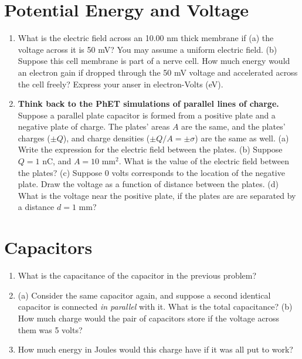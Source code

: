 \documentclass[10pt]{article}
\begin{document}
\section{Potential Energy and Voltage}

\begin{enumerate}
\item What is the electric field across an 10.00 nm thick membrane if (a) the voltage across it is 50 mV? You may assume a uniform electric field. (b) Suppose this cell membrane is part of a nerve cell.  How much energy would an electron gain if dropped through the 50 mV voltage and accelerated across the cell freely?  Express your anser in electron-Volts (eV). \\ \vspace{2cm}
\item \textbf{Think back to the PhET simulations of parallel lines of charge.}  Suppose a parallel plate capacitor is formed from a positive plate and a negative plate of charge.  The plates' areas $A$ are the same, and the plates' charges ($\pm Q$), and charge densities ($\pm Q/A = \pm \sigma$) are the same as well. (a) Write the expression for the electric field between the plates. (b) Suppose $Q = 1$ nC, and $A = 10$ mm$^2$.  What is the value of the electric field between the plates?  (c) Suppose 0 volts corresponds to the location of the negative plate.  Draw the voltage as a function of distance between the plates.  (d) What is the voltage near the positive plate, if the plates are are separated by a distance $d = 1$ mm? \\ \vspace{2cm}
\end{enumerate}

\section{Capacitors}

\begin{enumerate}
\item What is the capacitance of the capacitor in the previous problem? \\ \vspace{1cm}
\item (a) Consider the same capacitor again, and suppose a second identical capacitor is connected \textit{in parallel} with it.  What is the total capacitance? (b) How much charge would the pair of capacitors store if the voltage across them was 5 volts? \\ \vspace{1.5cm}
\item How much energy in Joules would this charge have if it was all put to work?
\end{enumerate}
\end{document}
